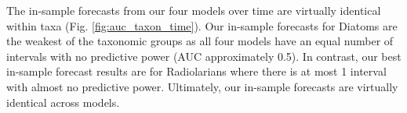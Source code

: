 \documentclass[12pt,letterpaper]{article}
\begin{document}
\begin{refsection}




The in-sample forecasts from our four models over time are virtually identical within taxa (Fig. \ref{fig:auc_taxon_time}). Our in-sample forecasts for Diatoms are the weakest of the taxonomic groups as all four models have an equal number of intervals with no predictive power (AUC approximately 0.5). In contrast, our best in-sample forecast results are for Radiolarians where there is at most 1 interval with almost no predictive power. Ultimately, our in-sample forecasts are virtually identical across models.


\end{refsection}
\end{document}
